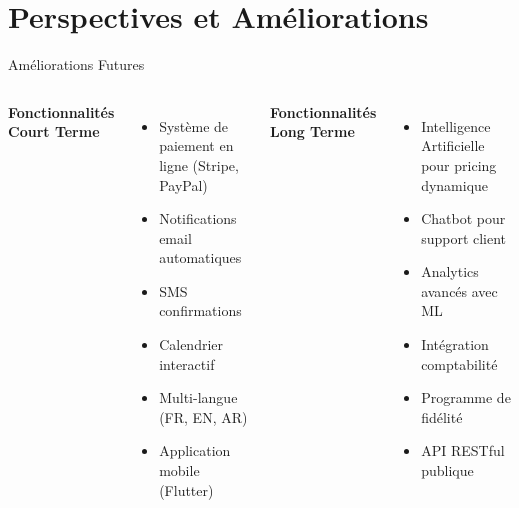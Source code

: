 \documentclass[aspectratio=169]{beamer}
\begin{document}
\section{Perspectives et Améliorations}

\begin{frame}{Améliorations Futures}
    \begin{columns}
        \textbf{Fonctionnalités Court Terme}
        \begin{itemize}
            \item Système de paiement en ligne (Stripe, PayPal)
            \item Notifications email automatiques
            \item SMS confirmations
            \item Calendrier interactif
            \item Multi-langue (FR, EN, AR)
            \item Application mobile (Flutter)
        \end{itemize}
        
        \textbf{Fonctionnalités Long Terme}
        \begin{itemize}
            \item Intelligence Artificielle pour pricing dynamique
            \item Chatbot pour support client
            \item Analytics avancés avec ML
            \item Intégration comptabilité
            \item Programme de fidélité
            \item API RESTful publique
        \end{itemize}
    \end{columns}
\end{frame}
\end{document}
